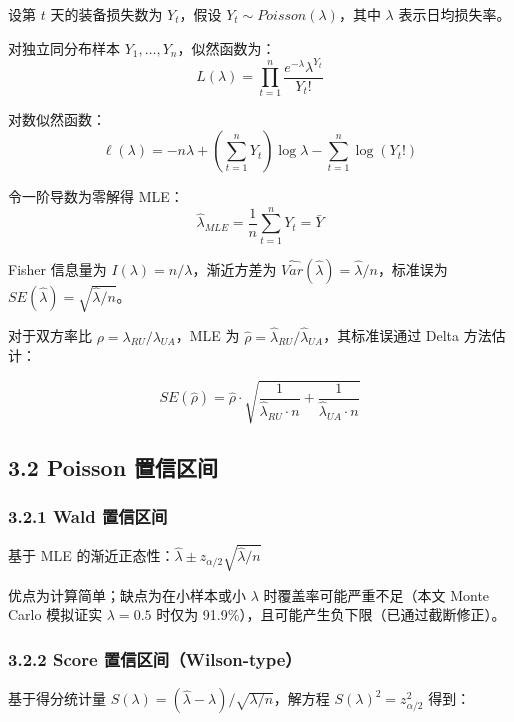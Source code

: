 \documentclass[
  a4paper,
  fontset=none,
]{ctexart}
\begin{document}
设第 \(t\) 天的装备损失数为 \(Y_t\)，假设
\(Y_t \sim Poisson(\lambda)\)，其中 \(\lambda\) 表示日均损失率。

对独立同分布样本 \(Y_1, \ldots, Y_n\)，似然函数为： \[
L(\lambda) = \prod_{t=1}^{n} \frac{e^{-\lambda} \lambda^{Y_t}}{Y_t!}
\]

对数似然函数： \[
\ell(\lambda) = -n\lambda + \left(\sum_{t=1}^{n} Y_t\right) \log \lambda - \sum_{t=1}^{n} \log(Y_t!)
\]

令一阶导数为零解得 MLE： \[
\hat{\lambda}_{MLE} = \frac{1}{n}\sum_{t=1}^{n} Y_t = \bar{Y}
\]

Fisher 信息量为 \(I(\lambda) = n/\lambda\)，渐近方差为
\(\widehat{Var}(\hat{\lambda}) = \hat{\lambda}/n\)，标准误为
\(SE(\hat{\lambda}) = \sqrt{\hat{\lambda}/n}\)。

对于双方率比 \(\rho = \lambda_{RU}/\lambda_{UA}\)，MLE 为
\(\hat{\rho} = \hat{\lambda}_{RU}/\hat{\lambda}_{UA}\)，其标准误通过
Delta 方法估计：

\[
SE(\hat{\rho}) = \hat{\rho} \cdot \sqrt{\frac{1}{\hat{\lambda}_{RU} \cdot n} + \frac{1}{\hat{\lambda}_{UA} \cdot n}}
\]

\hypertarget{poisson-ux7f6eux4fe1ux533aux95f4}{%
\subsection{3.2 Poisson
置信区间}\label{poisson-ux7f6eux4fe1ux533aux95f4}}

\hypertarget{wald-ux7f6eux4fe1ux533aux95f4}{%
\subsubsection{3.2.1 Wald
置信区间}\label{wald-ux7f6eux4fe1ux533aux95f4}}

基于 MLE
的渐近正态性：\(\hat{\lambda} \pm z_{\alpha/2} \sqrt{\hat{\lambda}/n}\)

优点为计算简单；缺点为在小样本或小 \(\lambda\)
时覆盖率可能严重不足（本文 Monte Carlo 模拟证实 \(\lambda=0.5\) 时仅为
91.9\%），且可能产生负下限（已通过截断修正）。

\hypertarget{score-ux7f6eux4fe1ux533aux95f4wilson-type}{%
\subsubsection{3.2.2 Score
置信区间（Wilson-type）}\label{score-ux7f6eux4fe1ux533aux95f4wilson-type}}

基于得分统计量
\(S(\lambda) = (\hat{\lambda} - \lambda) / \sqrt{\lambda/n}\)，解方程
\(S(\lambda)^2 = z_{\alpha/2}^2\) 得到：
\end{document}
